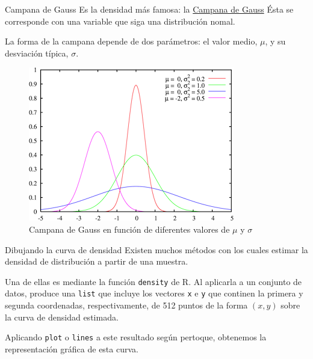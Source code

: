 \documentclass[
  ignorenonframetext,
]{beamer}
\begin{document}
\begin{frame}{Campana de Gauss}
\label{campana-de-gauss}
Es la densidad más famosa: la
\href{https://es.wikipedia.org/wiki/Función_gaussiana}{Campana de Gauss}
Ésta se corresponde con una variable que siga una distribución nomal.

La forma de la campana depende de dos parámetros: el valor medio,
\(\mu\), y su desviación típica, \(\sigma\).

\begin{figure}
\centering
\includegraphics{Imgs/gauss.png}
\caption{Campana de Gauss en función de diferentes valores de \(\mu\) y
\(\sigma\)}
\end{figure}
\end{frame}

\begin{frame}[fragile]{Dibujando la curva de densidad}
\label{dibujando-la-curva-de-densidad}
Existen muchos métodos con los cuales estimar la densidad de
distribución a partir de una muestra.

Una de ellas es mediante la función \texttt{density} de R. Al aplicarla
a un conjunto de datos, produce una \texttt{list} que incluye los
vectores \texttt{x} e \texttt{y} que continen la primera y segunda
coordenadas, respectivamente, de 512 puntos de la forma \((x,y)\) sobre
la curva de densidad estimada.

Aplicando \texttt{plot} o \texttt{lines} a este resultado según
pertoque, obtenemos la representación gráfica de esta curva.
\end{frame}
\end{document}
